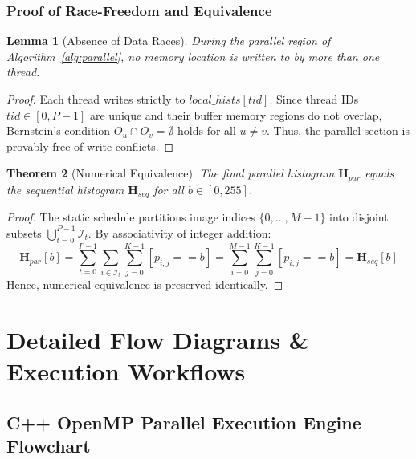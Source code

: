 \documentclass[12pt,a4paper,oneside]{report}
\newtheorem{theorem}{Theorem}[chapter]
\newtheorem{lemma}[theorem]{Lemma}
\begin{document}
\subsection{Proof of Race-Freedom and Equivalence}
\begin{lemma}[Absence of Data Races]
During the parallel region of Algorithm~\ref{alg:parallel}, no memory location is written to by more than one thread.
\end{lemma}
\begin{proof}
Each thread writes strictly to $local\_hists[tid]$. Since thread IDs $tid \in [0, P-1]$ are unique and their buffer memory regions do not overlap, Bernstein's condition $O_u \cap O_v = \emptyset$ holds for all $u \neq v$. Thus, the parallel section is provably free of write conflicts.
\end{proof}

\begin{theorem}[Numerical Equivalence]
The final parallel histogram $\mathbf{H}_{par}$ equals the sequential histogram $\mathbf{H}_{seq}$ for all $b \in [0, 255]$.
\end{theorem}
\begin{proof}
The static schedule partitions image indices $\{0, \dots, M-1\}$ into disjoint subsets $\bigcup_{t=0}^{P-1} \mathcal{I}_t$. By associativity of integer addition:
\begin{equation}
    \mathbf{H}_{par}[b] = \sum_{t=0}^{P-1} \sum_{i \in \mathcal{I}_t} \sum_{j=0}^{K-1} [p_{i,j} == b] = \sum_{i=0}^{M-1} \sum_{j=0}^{K-1} [p_{i,j} == b] = \mathbf{H}_{seq}[b]
\end{equation}
Hence, numerical equivalence is preserved identically.
\end{proof}

\chapter{Detailed Flow Diagrams \& Execution Workflows}

\section{C++ OpenMP Parallel Execution Engine Flowchart}
\end{document}
